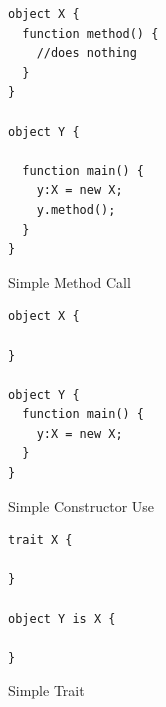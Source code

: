 \documentclass[11pt,a4paper]{report}
\begin{document}
\begin{figure}[H]
\begin{verbatim}
object X {
  function method() {
    //does nothing
  }
}

object Y {

  function main() {
    y:X = new X;
    y.method();
  }
}
\end{verbatim}
\caption{Simple Method Call}
\end{figure}

\begin{figure}[H]
\begin{verbatim}
object X {

}

object Y {
  function main() {
    y:X = new X;
  }
}
\end{verbatim}
\caption{Simple Constructor Use}
\end{figure}

\begin{figure}[H]
\begin{verbatim}
trait X {

}

object Y is X {

}
\end{verbatim}
\caption{Simple Trait}
\end{figure}
\end{document}
